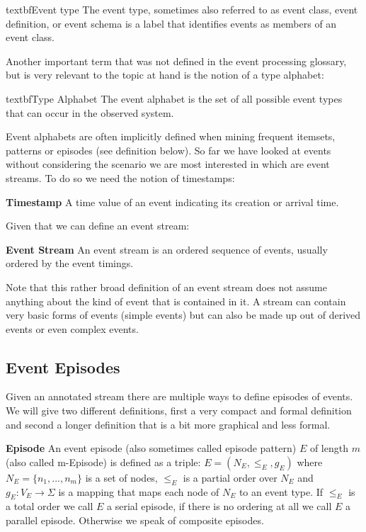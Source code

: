 \begin{mydef}
textbf{Event type} The event type, sometimes also referred to as event class, event definition, or event schema is a label that identifies events as members of an event class.
\end{mydef}

Another important term that was not defined in the event processing glossary, but is very relevant to the topic at hand is the notion of a type alphabet:

\begin{mydef}
textbf{Type Alphabet} The event alphabet is the set of all possible event types that can occur in the observed system.
\end{mydef}

Event alphabets are often implicitly defined when mining frequent itemsets, patterns or episodes (see definition below).
So far we have looked at events without considering the scenario we are most interested in which are event streams. To do so we need the notion of timestamps:

\begin{mydef}
\textbf{Timestamp} A time value of an event indicating its creation or arrival time.
\end{mydef}

Given that we can define an event stream:

\begin{mydef}
\textbf{Event Stream} An event stream is an ordered sequence of events, usually ordered by the event timings.
\end{mydef}

Note that this rather broad definition of an event stream does not assume anything about the kind of event that is contained in it. A stream can contain very basic forms of events (simple events) but can also be made up out of derived events or even complex events. 


\subsection{Event Episodes}

Given an annotated stream there are multiple ways to define episodes of events. We will give two different definitions, first a very compact and formal definition and second a longer definition that is a bit more graphical and less formal.

\begin{mydef}
\textbf{Episode} An event episode (also sometimes called episode pattern) $E$ of length $m$ (also called m-Episode) is defined as a triple: $E = (N_E,{\leq}_{E},g_E)$ where $N_E = \{n_1,...,n_m\}$ is a set of nodes, ${\leq}_{E}$ is a partial order over $N_E$ and $g_E : V_E \rightarrow \Sigma$ is a mapping that maps each node of $N_E$ to an event type. If ${\leq}_{E}$ is a total order we call $E$ a serial episode, if there is no ordering at all we call $E$ a parallel episode. Otherwise we speak of composite episodes.
\end{mydef}

